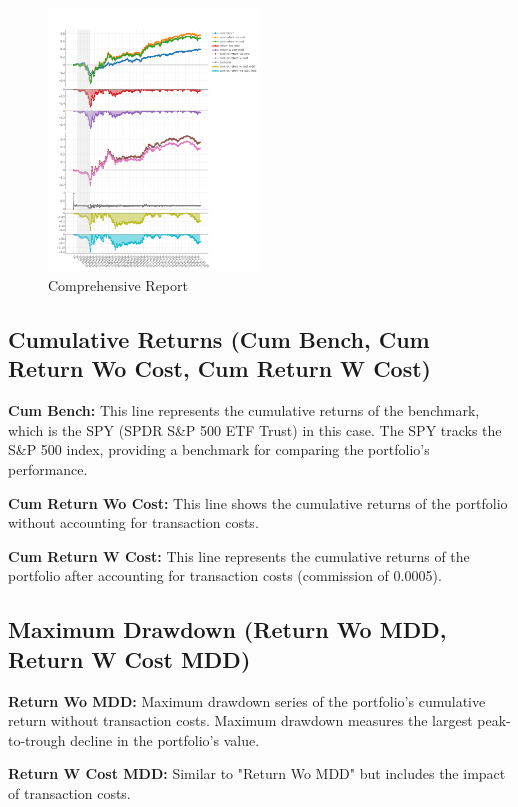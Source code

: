 \documentclass[conference]{IEEEtran}
\begin{document}
\begin{figure}[h!]
\centering
\includegraphics[width=0.5\textwidth]{plot_0.png}
\caption{Comprehensive Report}
\label{fig:comprehensive report}
\end{figure}

\subsection*{\textbf{Cumulative Returns (Cum Bench, Cum Return Wo Cost, Cum Return W Cost)}}

\textbf{Cum Bench:}
This line represents the cumulative returns of the benchmark, which is the SPY (SPDR S\&P 500 ETF Trust) in this case. The SPY tracks the S\&P 500 index, providing a benchmark for comparing the portfolio's performance.

\textbf{Cum Return Wo Cost:}
This line shows the cumulative returns of the portfolio without accounting for transaction costs.

\textbf{Cum Return W Cost:}
This line represents the cumulative returns of the portfolio after accounting for transaction costs (commission of 0.0005).

\subsection*{\textbf{Maximum Drawdown (Return Wo MDD, Return W Cost MDD)}}
\textbf{Return Wo MDD:}
Maximum drawdown series of the portfolio's cumulative return without transaction costs. Maximum drawdown measures the largest peak-to-trough decline in the portfolio's value.

\textbf{Return W Cost MDD:}
Similar to "Return Wo MDD" but includes the impact of transaction costs.
\end{document}
